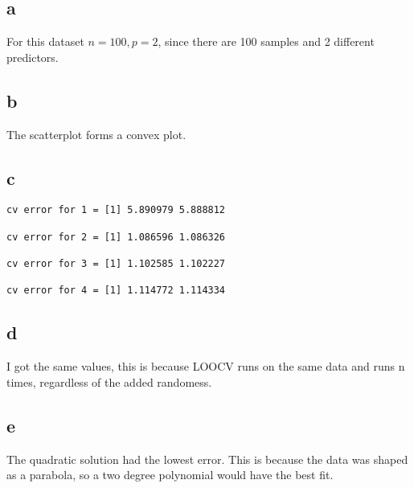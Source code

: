 \documentclass{article}
\begin{document}
\subsection*{a}
For this dataset $n = 100, p = 2$, since there are 100 samples and 2 different predictors.\\
\subsection*{b}
The scatterplot forms a convex plot.\\

\subsection*{c}
\begin{verbatim}
cv error for 1 = [1] 5.890979 5.888812

cv error for 2 = [1] 1.086596 1.086326

cv error for 3 = [1] 1.102585 1.102227

cv error for 4 = [1] 1.114772 1.114334
\end{verbatim}

\subsection*{d}
I got the same values, this is because LOOCV runs on the same data and runs n times, regardless of the added randomess.\\
\subsection*{e}
The quadratic solution had the lowest error. This is because the data was shaped as a parabola, so a two degree polynomial would have the best fit.\\
\end{document}
